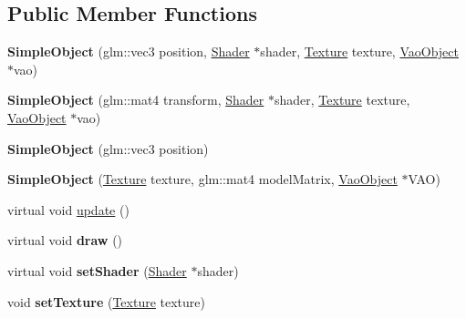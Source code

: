 \subsection*{Public Member Functions}
\begin{DoxyCompactItemize}
\item 
\mbox{\label{class_simple_object_a4b237a7f96bed83ec599c0af41a9dbf6}} 
{\bfseries Simple\+Object} (glm\+::vec3 position, \hyperlink{class_shader}{Shader} $\ast$shader, \hyperlink{class_texture}{Texture} texture, \hyperlink{class_vao_object}{Vao\+Object} $\ast$vao)
\item 
\mbox{\label{class_simple_object_ad0d7d8b5224adfb044be1a9a11dbdda8}} 
{\bfseries Simple\+Object} (glm\+::mat4 transform, \hyperlink{class_shader}{Shader} $\ast$shader, \hyperlink{class_texture}{Texture} texture, \hyperlink{class_vao_object}{Vao\+Object} $\ast$vao)
\item 
\mbox{\label{class_simple_object_a24bfa1fa17d1097cb197f6350862c39f}} 
{\bfseries Simple\+Object} (glm\+::vec3 position)
\item 
\mbox{\label{class_simple_object_a59ed585f31accdf25d14dedbe3463d93}} 
{\bfseries Simple\+Object} (\hyperlink{class_texture}{Texture} texture, glm\+::mat4 model\+Matrix, \hyperlink{class_vao_object}{Vao\+Object} $\ast$V\+AO)
\item 
virtual void \hyperlink{class_simple_object_a38a3ceafd11a673fd68dd87ed6ebd35b}{update} ()
\item 
\mbox{\label{class_simple_object_a920aa438e4414745847cf284ca00e71d}} 
virtual void {\bfseries draw} ()
\item 
\mbox{\label{class_simple_object_aa4d4ccdd87ff9ee1676573e6a1f8a335}} 
virtual void {\bfseries set\+Shader} (\hyperlink{class_shader}{Shader} $\ast$shader)
\item 
\mbox{\label{class_simple_object_a23f24ff02b60e625170e7c00991eeff6}} 
void {\bfseries set\+Texture} (\hyperlink{class_texture}{Texture} texture)
\item 
\mbox{\label{class_simple_object_a87e1ea0f304176fdb6b61fdd50acedcb}} 

\end{DoxyCompactItemize}
